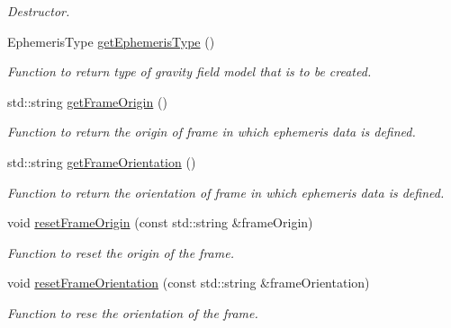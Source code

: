 \begin{DoxyCompactItemize}
\begin{DoxyCompactList}\small\item\em Destructor. \end{DoxyCompactList}\item 
Ephemeris\+Type \hyperlink{classtudat_1_1simulation__setup_1_1EphemerisSettings_a3256a2c33076cf34e070d269effa660a}{get\+Ephemeris\+Type} ()
\begin{DoxyCompactList}\small\item\em Function to return type of gravity field model that is to be created. \end{DoxyCompactList}\item 
std\+::string \hyperlink{classtudat_1_1simulation__setup_1_1EphemerisSettings_ad944818e2e49e527b955b39e3d09f608}{get\+Frame\+Origin} ()
\begin{DoxyCompactList}\small\item\em Function to return the origin of frame in which ephemeris data is defined. \end{DoxyCompactList}\item 
std\+::string \hyperlink{classtudat_1_1simulation__setup_1_1EphemerisSettings_a02f84b6df414e81a4f72d6a5b2aceb33}{get\+Frame\+Orientation} ()
\begin{DoxyCompactList}\small\item\em Function to return the orientation of frame in which ephemeris data is defined. \end{DoxyCompactList}\item 
void \hyperlink{classtudat_1_1simulation__setup_1_1EphemerisSettings_a2dbcb55a4542b28610c2a389b89c4447}{reset\+Frame\+Origin} (const std\+::string \&frame\+Origin)
\begin{DoxyCompactList}\small\item\em Function to reset the origin of the frame. \end{DoxyCompactList}\item 
void \hyperlink{classtudat_1_1simulation__setup_1_1EphemerisSettings_adad130efb8ba76972cb24f5787835e45}{reset\+Frame\+Orientation} (const std\+::string \&frame\+Orientation)
\begin{DoxyCompactList}\small\item\em Function to rese the orientation of the frame. \end{DoxyCompactList}\end{DoxyCompactItemize}
